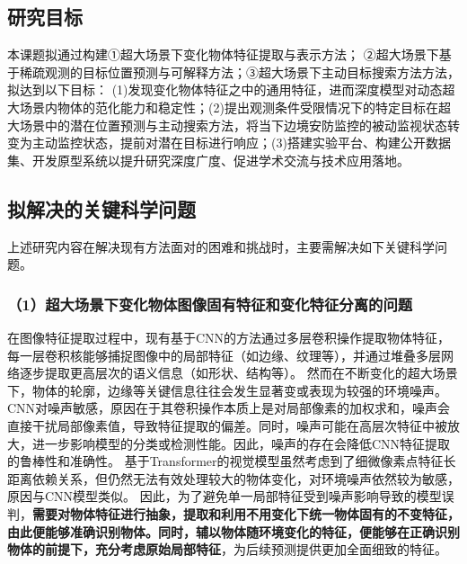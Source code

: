 \subsection{研究目标}

本课题拟通过构建①超大场景下变化物体特征提取与表示方法；
②超大场景下基于稀疏观测的目标位置预测与可解释方法；③超大场景下主动目标搜索方法方法，拟达到以下目标：
(1)发现变化物体特征之中的通用特征，进而深度模型对动态超大场景内物体的范化能力和稳定性；(2)提出观测条件受限情况下的特定目标在超大场景中的潜在位置预测与主动搜索方法，将当下边境安防监控的被动监视状态转变为主动监控状态，提前对潜在目标进行响应；(3)搭建实验平台、构建公开数据集、开发原型系统以提升研究深度广度、促进学术交流与技术应用落地。

\subsection{拟解决的关键科学问题}

上述研究内容在解决现有方法面对的困难和挑战时，主要需解决如下关键科学问题。


\subsubsection*{\bfseries （1）超大场景下变化物体图像固有特征和变化特征分离的问题}
在图像特征提取过程中，现有基于CNN的方法通过多层卷积操作提取物体特征，每一层卷积核能够捕捉图像中的局部特征（如边缘、纹理等），并通过堆叠多层网络逐步提取更高层次的语义信息（如形状、结构等）。
然而在不断变化的超大场景下，物体的轮廓，边缘等关键信息往往会发生显著变或表现为较强的环境噪声。
CNN对噪声敏感，原因在于其卷积操作本质上是对局部像素的加权求和，噪声会直接干扰局部像素值，导致特征提取的偏差。同时，噪声可能在高层次特征中被放大，进一步影响模型的分类或检测性能。因此，噪声的存在会降低CNN特征提取的鲁棒性和准确性。
基于Transformer的视觉模型虽然考虑到了细微像素点特征长距离依赖关系，但仍然无法有效处理较大的物体变化，对环境噪声依然较为敏感，原因与CNN模型类似。
因此，为了避免单一局部特征受到噪声影响导致的模型误判，\textbf{需要对物体特征进行抽象，提取和利用不用变化下统一物体固有的不变特征，由此便能够准确识别物体。同时，辅以物体随环境变化的特征，便能够在正确识别物体的前提下，充分考虑原始局部特征}，为后续预测提供更加全面细致的特征。


